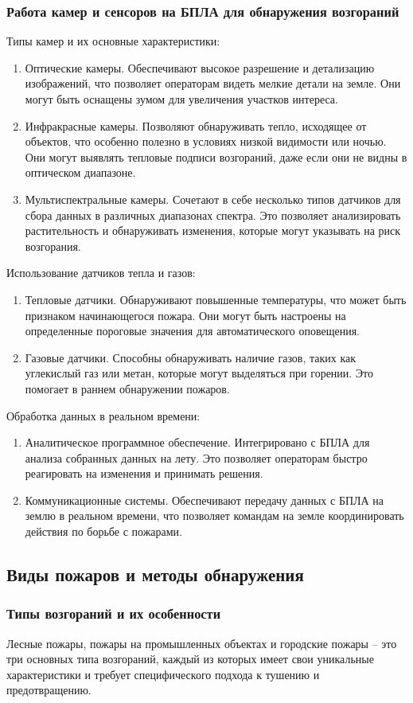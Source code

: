 \subsubsection{Работа камер и сенсоров на БПЛА для обнаружения возгораний}
Типы камер и их основные характеристики:
\begin{enumerate}
	\item Оптические камеры. Обеспечивают высокое разрешение и детализацию изображений, что позволяет операторам видеть мелкие детали на земле. Они могут быть оснащены зумом для увеличения участков интереса.
	\item Инфракрасные камеры. Позволяют обнаруживать тепло, исходящее от объектов, что особенно полезно в условиях низкой видимости или ночью. Они могут выявлять тепловые подписи возгораний, даже если они не видны в оптическом диапазоне.
	\item Мультиспектральные камеры. Сочетают в себе несколько типов датчиков для сбора данных в различных диапазонах спектра. Это позволяет анализировать растительность и обнаруживать изменения, которые могут указывать на риск возгорания.
\end{enumerate}
Использование датчиков тепла и газов:
\begin{enumerate}
	\item Тепловые датчики. Обнаруживают повышенные температуры, что может быть признаком начинающегося пожара. Они могут быть настроены на определенные пороговые значения для автоматического оповещения.
	\item Газовые датчики. Способны обнаруживать наличие газов, таких как углекислый газ или метан, которые могут выделяться при горении. Это помогает в раннем обнаружении пожаров.
\end{enumerate}
Обработка данных в реальном времени:
\begin{enumerate}
	\item Аналитическое программное обеспечение. Интегрировано с БПЛА для анализа собранных данных на лету. Это позволяет операторам быстро реагировать на изменения и принимать решения.
	\item Коммуникационные системы. Обеспечивают передачу данных с БПЛА на землю в реальном времени, что позволяет командам на земле координировать действия по борьбе с пожарами.
\end{enumerate}
\subsection{Виды пожаров и методы обнаружения}
\subsubsection{Типы возгораний и их особенности}
Лесные пожары, пожары на промышленных объектах и городские пожары – это три основных типа возгораний, каждый из которых имеет свои уникальные характеристики и требует специфического подхода к тушению и предотвращению.

